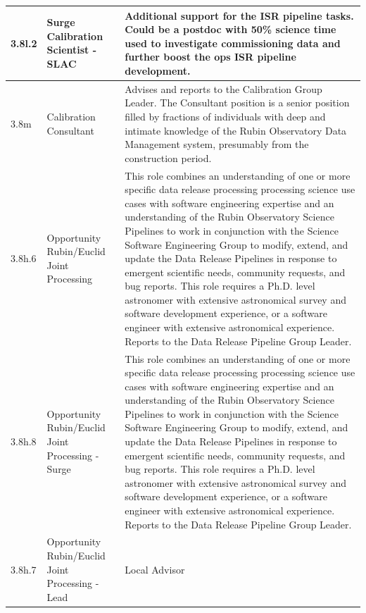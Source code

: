 \begin{longtable} {|p{}|p{}|p{}|}
{3.8l.2}&{Surge Calibration Scientist - SLAC}&{Additional support for the ISR pipeline tasks. Could be a postdoc with 50\% science time used to investigate commissioning data and further boost the ops ISR pipeline development.} \\ \hline
{3.8m}&{Calibration Consultant}&{Advises and reports to the Calibration Group Leader. The Consultant position is a senior position filled by fractions of individuals with deep and intimate knowledge of the Rubin Observatory Data Management system, presumably from the construction period.} \\ \hline
{3.8h.6}&{Opportunity Rubin/Euclid Joint Processing}&{This role combines an understanding of one or more specific data release processing processing science use cases with software engineering expertise and an understanding of the Rubin Observatory Science Pipelines to work in conjunction with the Science Software Engineering Group to modify, extend, and update the Data Release Pipelines in response to emergent scientific needs, community requests, and bug reports. This role requires a Ph.D. level astronomer with extensive astronomical survey and software development experience, or a software engineer with extensive astronomical experience. Reports to the Data Release Pipeline Group Leader.} \\ \hline
{3.8h.8}&{Opportunity Rubin/Euclid Joint Processing - Surge}&{This role combines an understanding of one or more specific data release processing processing science use cases with software engineering expertise and an understanding of the Rubin Observatory Science Pipelines to work in conjunction with the Science Software Engineering Group to modify, extend, and update the Data Release Pipelines in response to emergent scientific needs, community requests, and bug reports. This role requires a Ph.D. level astronomer with extensive astronomical survey and software development experience, or a software engineer with extensive astronomical experience. Reports to the Data Release Pipeline Group Leader.} \\ \hline
{3.8h.7}&{Opportunity Rubin/Euclid Joint Processing - Lead}&{Local Advisor} \\ \hline
\end{longtable} \normalsize
